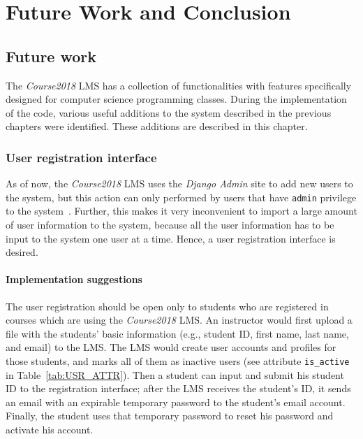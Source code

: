 

\chapter{Future Work and Conclusion}
\label{chap:FUTURE}

\section{Future work}
The \emph{Course2018} LMS has a collection of functionalities 
with features specifically designed for computer science programming
classes.
During the implementation of the code, various useful additions to the system
described in the previous chapters were identified.
These additions are described in this chapter.

\subsection{User registration interface}
As of now, the \emph{Course2018} LMS uses the \emph{Django Admin} site to
add new users to the system, but this action can only performed by users that
have \texttt{admin} privilege to the system~\cite{AdjangoAdmin}.
Further, this
makes it very inconvenient to import a large amount of user information to
the system, because all the user information has to be input to the system one
user at a time. Hence, a user registration interface is desired.

\subsubsection{Implementation suggestions}
The user registration should be open only to students
who are registered in courses which are using the \emph{Course2018} LMS.
An instructor would first upload a file with the students' basic information
(e.g., student ID, first name, last name, and email) to the LMS. The LMS would
create user accounts and profiles for those students, and marks all of them
as inactive users (see attribute \texttt{is\_active} in
Table~\ref{tab:USR_ATTR}).
Then a student can input and submit his student ID to the registration
interface; after the LMS receives the student's ID,
it sends an email with an expirable temporary password to the student's
email account.
Finally, the student uses that temporary password to reset his password and
activate his account.

